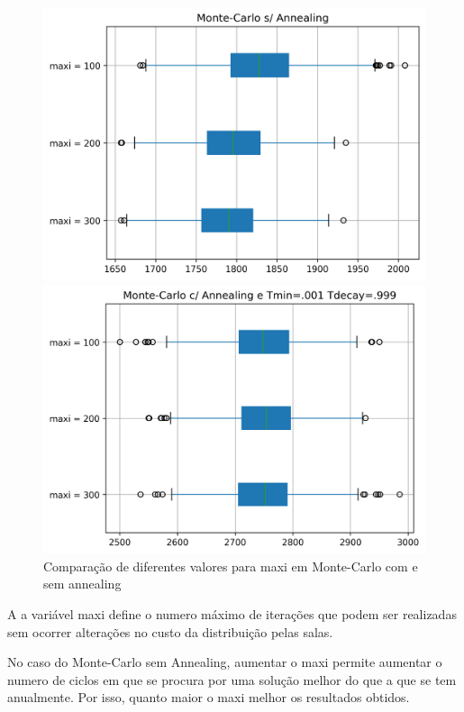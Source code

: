 \documentclass[a4paper]{report}
\begin{document}
\begin{figure}[h]
\centering
\begin{minipage}{.5\textwidth}
  \centering
  \includegraphics[width=.95\linewidth]{images/graph_comp_maxi_mc.png}
\end{minipage}%
\begin{minipage}{.5\textwidth}
  \centering
  \includegraphics[width=.95\linewidth]{images/graph_comp_maxi_sa.png}
\end{minipage}
    \caption{Comparação de diferentes valores para maxi em Monte-Carlo com e sem annealing}
\end{figure}

A a variável maxi define o numero máximo de iterações que podem ser realizadas sem
ocorrer alterações no custo da distribuição pelas salas.

No caso do Monte-Carlo sem Annealing, aumentar o maxi permite aumentar o numero
de ciclos em que se procura por uma solução melhor do que a que se tem
anualmente. Por isso, quanto maior o maxi melhor os resultados obtidos.
\end{document}
